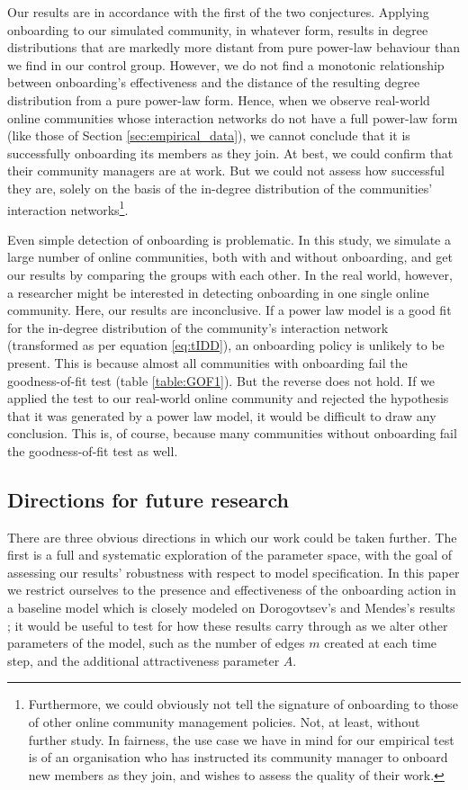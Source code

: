 \documentclass{article}
\begin{document}
Our results are in accordance with the first of the two conjectures. Applying onboarding to our simulated community, in whatever form, results in degree distributions that are markedly more distant from pure power-law behaviour than we find in our control group. However, we do not find a monotonic relationship between onboarding's effectiveness and the distance of the resulting degree distribution from a pure power-law form. Hence, when we observe real-world online communities whose interaction networks do not have a full power-law form (like those of Section \ref{sec:empirical_data}), we cannot conclude that it is successfully onboarding its members as they join. At best, we could confirm that their community managers are at work. But we could not assess how successful they are, solely on the basis of the in-degree distribution of the communities' interaction networks\footnote{Furthermore, we could obviously not tell the signature of onboarding to those of other online community management policies. Not, at least, without further study. In fairness, the use case we have in mind for our empirical test is of an organisation who has instructed its community manager to onboard new members as they join, and wishes to assess the quality of their work.}. 

Even simple detection of onboarding is problematic. In this study, we simulate a large  number of online communities, both with and without onboarding, and get our results by comparing the groups with each other. In the real world, however, a researcher might be interested in detecting onboarding in one single online community. Here, our results are inconclusive. If a power law model is a good fit for the in-degree distribution of the community's interaction network (transformed as per equation \ref{eq:tIDD}), an onboarding policy is unlikely to be present. This is because almost all communities with onboarding fail the goodness-of-fit test (table \ref{table:GOF1}). But the reverse does not hold. If we applied the test to our real-world online community and rejected the hypothesis that it was generated by a power law model, it would be difficult to draw any conclusion. This is, of course, because many communities without onboarding fail the goodness-of-fit test as well. 

\subsection{Directions for future research}

There are three obvious directions in which our work could be taken further. The first is a full and systematic exploration of the parameter space, with the goal of assessing our results' robustness with respect to model specification. In this paper we restrict ourselves to the presence and effectiveness of the onboarding action in a baseline model which is closely modeled on Dorogovtsev's and Mendes's results \cite{dorogovtsev2002evolution}; it would be useful to test for how these results carry through as we alter other parameters of the model, such as the number of edges $m$ created at each time step, and the additional attractiveness parameter $A$. 
\end{document}

